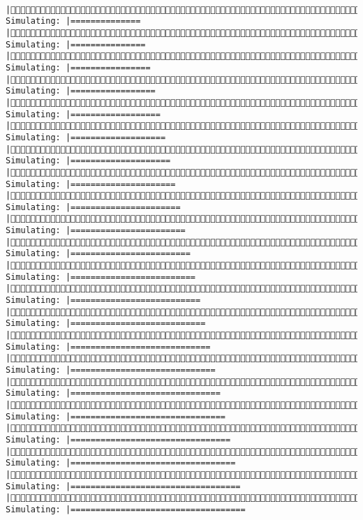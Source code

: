\documentclass[]{article}
\begin{document}
\begin{verbatim}
     |(2/4) Simulating: |==============                                         |(2/4) Simulating: |===============                                        |(2/4) Simulating: |================                                       |(2/4) Simulating: |=================                                      |(2/4) Simulating: |==================                                     |(2/4) Simulating: |===================                                    |(2/4) Simulating: |====================                                   |(2/4) Simulating: |=====================                                  |(2/4) Simulating: |======================                                 |(2/4) Simulating: |=======================                                |(2/4) Simulating: |========================                               |(2/4) Simulating: |=========================                              |(2/4) Simulating: |==========================                             |(2/4) Simulating: |===========================                            |(2/4) Simulating: |============================                           |(2/4) Simulating: |=============================                          |(2/4) Simulating: |==============================                         |(2/4) Simulating: |===============================                        |(2/4) Simulating: |================================                       |(2/4) Simulating: |=================================                      |(2/4) Simulating: |==================================                     |(2/4) Simulating: |===================================                    
\end{verbatim}
\end{document}
